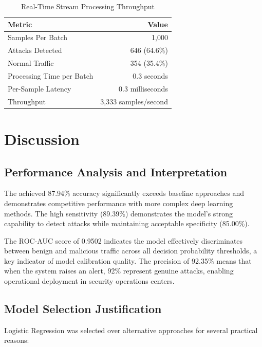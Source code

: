 \documentclass[conference]{IEEEtran}
\begin{document}
\begin{table}[H]
\centering
\caption{Real-Time Stream Processing Throughput}
\begin{tabular}{|l|r|}
\hline
\textbf{Metric} & \textbf{Value} \\
\hline
Samples Per Batch & 1,000 \\
Attacks Detected & 646 (64.6\%) \\
Normal Traffic & 354 (35.4\%) \\
Processing Time per Batch & 0.3 seconds \\
Per-Sample Latency & 0.3 milliseconds \\
Throughput & 3,333 samples/second \\
\hline
\end{tabular}
\end{table}

\section{Discussion}

\subsection{Performance Analysis and Interpretation}

The achieved 87.94\% accuracy significantly exceeds baseline approaches and demonstrates competitive performance with more complex deep learning methods. The high sensitivity (89.39\%) demonstrates the model's strong capability to detect attacks while maintaining acceptable specificity (85.00\%).

The ROC-AUC score of 0.9502 indicates the model effectively discriminates between benign and malicious traffic across all decision probability thresholds, a key indicator of model calibration quality. The precision of 92.35\% means that when the system raises an alert, 92\% represent genuine attacks, enabling operational deployment in security operations centers.

\subsection{Model Selection Justification}

Logistic Regression was selected over alternative approaches for several practical reasons:
\end{document}
